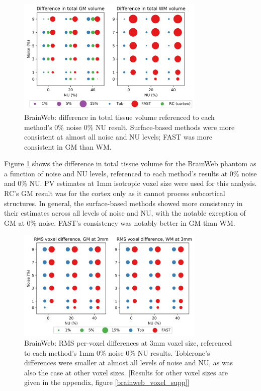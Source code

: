 \documentclass[12pt]{report}
\begin{document}
\begin{figure}[H]
\centering
\includegraphics[width = 0.8\textwidth]{brainweb_total.png}
\caption{BrainWeb: difference in total tissue volume referenced to each method’s 0\% noise 0\% NU result. Surface-based methods were more consistent at almost all noise and NU levels; FAST was more consistent in GM than WM.}
\label{brainweb_total}
\end{figure}

Figure \ref{brainweb_total} shows the difference in total tissue volume for the BrainWeb phantom as a function of noise and NU levels, referenced to each method’s results at 0\% noise and 0\% NU. PV estimates at 1mm isotropic voxel size were used for this analysis. RC’s GM result was for the cortex only as it cannot process subcortical structures. In general, the surface-based methods showed more consistency in their estimates across all levels of noise and NU, with the notable exception of GM at 0\% noise. FAST’s consistency was notably better in GM than WM.

\begin{figure}[H]
\centering
\includegraphics[width = 0.8\textwidth]{brainweb_voxel.png}
\caption{BrainWeb: RMS per-voxel differences at 3mm voxel size, referenced to each method’s 1mm 0\% noise 0\% NU results. Toblerone’s differences were smaller at almost all levels of noise and NU, as was also the case at other voxel sizes. [Results for other voxel sizes are given in the appendix, figure \ref{brainweb_voxel_supp}]}
\label{brainweb_voxel}
\end{figure}
\end{document}
